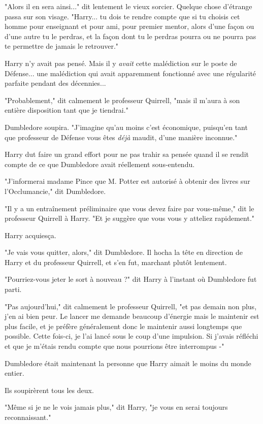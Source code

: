 "Alors il en sera ainsi..." dit lentement le vieux sorcier. Quelque chose d'étrange passa sur son visage. "Harry... tu dois te rendre compte que si tu choisis cet homme pour enseignant et pour ami, pour premier mentor, alors d'une façon ou d'une autre tu le perdras, et la façon dont tu le perdras pourra ou ne pourra pas te permettre de jamais le retrouver."

Harry n'y avait pas pensé. Mais il y \emph{avait}  cette malédiction sur le poste de Défense... une malédiction qui avait apparemment fonctionné avec une régularité parfaite pendant des décennies...

"Probablement," dit calmement le professeur Quirrell, "mais il m'aura à son entière disposition tant que je tiendrai."

Dumbledore soupira. "J'imagine qu'au moins c'est économique, puisqu'en tant que professeur de Défense vous êtes \emph{déjà}  maudit, d'une manière inconnue."

Harry dut faire un grand effort pour ne pas trahir sa pensée quand il se rendit compte de ce que Dumbledore avait réellement sous-entendu.

"J'informerai madame Pince que M. Potter est autorisé à obtenir des livres sur l'Occlumancie," dit Dumbledore.

"Il y a un entraînement préliminaire que vous devez faire par vous-même," dit le professeur Quirrell à Harry. "Et je suggère que vous vous y atteliez rapidement."

Harry acquiesça.

"Je vais vous quitter, alors," dit Dumbledore. Il hocha la tête en direction de Harry et du professeur Quirrell, et s'en fut, marchant plutôt lentement.

"Pourriez-vous jeter le sort à nouveau ?" dit Harry à l'instant où Dumbledore fut parti.

"Pas aujourd'hui," dit calmement le professeur Quirrell, "et pas demain non plus, j'en ai bien peur. Le lancer me demande beaucoup d'énergie mais le maintenir est plus facile, et je préfère généralement donc le maintenir aussi longtemps que possible. Cette fois-ci, je l'ai lancé sous le coup d'une impulsion. Si j'avais réfléchi et que je m'étais rendu compte que nous pourrions être interrompus -"

Dumbledore était maintenant la personne que Harry aimait le moins du monde entier.

Ils soupirèrent tous les deux.

"Même si je ne le vois jamais plus," dit Harry, "je vous en serai toujours reconnaissant."

